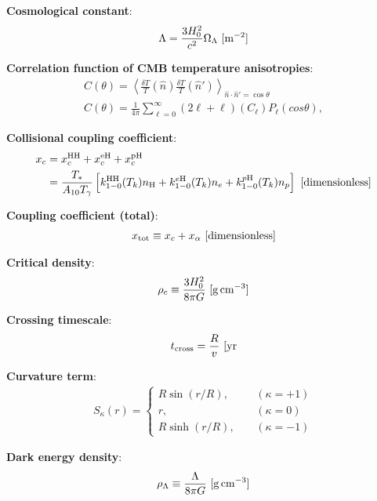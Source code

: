 \documentclass[a4paper,11pt]{article}
\begin{document}
{\noindent}\textbf{Cosmological constant}:
\begin{align*}
    \Lambda = \frac{3H_0^2}{c^2}\Omega_\Lambda ~ [{\rm m^{-2}}]
\end{align*}

{\noindent}\textbf{Correlation function of CMB temperature anisotropies}:
\begin{align*}
    C(\theta) = \left\langle\frac{\delta T}{T}(\hat{n})\frac{\delta T}{T}(\hat{n}')\right\rangle_{\hat{n}\cdot\hat{n}'=\cos\theta} \\
    C(\theta) = \frac{1}{4\pi} \sum\limits_{\ell=0}^\infty (2\ell+\ell)(C_\ell)P_\ell(cos\theta),
\end{align*}

{\noindent}\textbf{Collisional coupling coefficient}:
\begin{align*}
    x_c &= x_c^\mathrm{HH} + x_c^\mathrm{eH} + x_c^\mathrm{pH} \\
        &= \frac{T_*}{A_{10}T_\gamma} \left[k_{1-0}^\mathrm{HH}(T_k)n_\mathrm{H}+k_{1-0}^{e\mathrm{H}}(T_k)n_e+k_{1-0}^{p\mathrm{H}}(T_k)n_p\right] ~ [{\rm dimensionless}]
\end{align*}

{\noindent}\textbf{Coupling coefficient (total)}:
\begin{align*}
    x_\mathrm{tot} \equiv x_c + x_\alpha ~ [{\rm dimensionless}]
\end{align*}

{\noindent}\textbf{Critical density}:
\begin{align*}
    \rho_c \equiv \dfrac{3H_0^2}{8\pi G}  ~ [{\rm g\,cm^{-3}}]
\end{align*}

{\noindent}\textbf{Crossing timescale}:
\begin{align*}
    t_\mathrm{cross} = \frac{R}{v} ~ [{\rm yr}
\end{align*}

{\noindent}\textbf{Curvature term}:
\begin{align*}
S_\kappa(r) =
\left\{
\begin{aligned}
R\sin(r/R), ~~~~~& (\kappa = +1) \\
          r,~~~~~& (\kappa = 0) \\
R\sinh(r/R),~~~~~& (\kappa = -1)
\end{aligned}
\right.
\end{align*}

{\noindent}\textbf{Dark energy density}:
\begin{align*}
    \rho_\Lambda \equiv \dfrac{\Lambda}{8\pi G} ~ [{\rm g\,cm^{-3}}]
\end{align*}
\end{document}
